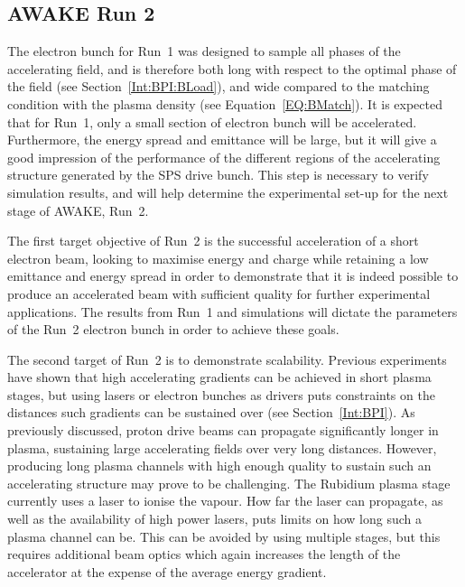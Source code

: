 \subsection{AWAKE Run 2}
\label{WFA:AWAKE:R2}

The electron bunch for Run~1 was designed to sample all phases of the accelerating field, and is therefore both long with respect to the optimal phase of the field (see Section~\ref{Int:BPI:BLoad}), and wide compared to the matching condition with the plasma density (see Equation~\ref{EQ:BMatch}).
It is expected that for Run~1, only a small section of electron bunch will be accelerated.
Furthermore, the energy spread and emittance will be large, but it will give a good impression of the performance of the different regions of the accelerating structure generated by the SPS drive bunch.
This step is necessary to verify simulation results, and will help determine the experimental set-up for the next stage of AWAKE, Run~2.

The first target objective of Run~2 is the successful acceleration of a short electron beam, looking to maximise energy and charge while retaining a low emittance and energy spread in order to demonstrate that it is indeed possible to produce an accelerated beam with sufficient quality for further experimental applications.
The results from Run~1 and simulations will dictate the parameters of the Run~2 electron bunch in order to achieve these goals.

The second target of Run~2 is to demonstrate scalability.
Previous experiments have shown that high accelerating gradients can be achieved in short plasma stages, but using lasers or electron bunches as drivers puts constraints on the distances such gradients can be sustained over (see Section~\ref{Int:BPI}).
As previously discussed, proton drive beams can propagate significantly longer in plasma, sustaining large accelerating fields over very long distances.
However, producing long plasma channels with high enough quality to sustain such an accelerating structure may prove to be challenging.
The Rubidium plasma stage currently uses a laser to ionise the vapour.
How far the laser can propagate, as well as the availability of high power lasers, puts limits on how long such a plasma channel can be.
This can be avoided by using multiple stages, but this requires additional beam optics which again increases the length of the accelerator at the expense of the average energy gradient.

